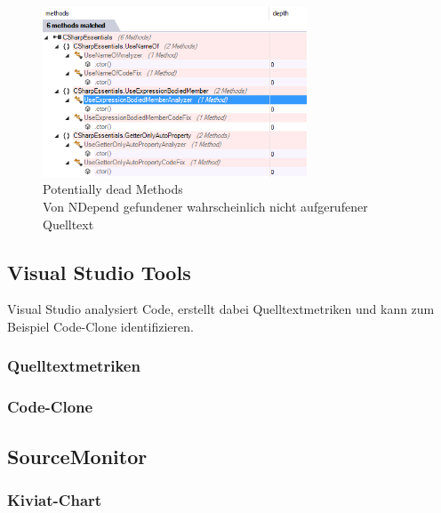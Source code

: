 \begin{figure}[ht]
\centering
\includegraphics[width=0.7\textwidth]{images/dead-methods.png}
\caption[Potentially dead Methods]{Potentially dead Methods \\ Von NDepend gefundener wahrscheinlich nicht aufgerufener Quelltext\endtabular}
\label{fig:dead-methods}
\end{figure}

\subsection{Visual Studio Tools}
Visual Studio analysiert Code, erstellt dabei Quelltextmetriken und kann zum Beispiel Code-Clone identifizieren.

\subsubsection{Quelltextmetriken}

\subsubsection{Code-Clone}


\subsection{SourceMonitor}

\subsubsection{Kiviat-Chart}
